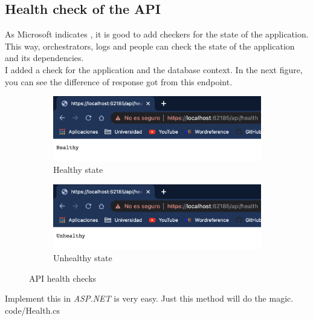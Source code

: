     \subsection{Health check of the API}
    As Microsoft indicates \cite{Health}, it is good to add checkers for the state of the application. This way, orchestrators, logs and people can check the state of the application and its dependencies. \\
    I added a check for the application and the database context. In the next figure, you can see the difference of response got from this endpoint. \\
    
    \begin{figure}[H]
        \centering
        \begin{subfigure}[T]{0.49\textwidth}
            \centering
            \includegraphics[width=\textwidth]{assets/healthy.png}
            \caption{Healthy state}
            \label{fig:impl_healthy}
        \end{subfigure}
        \hfill
        \begin{subfigure}[T]{0.49\textwidth}
            \centering
            \includegraphics[width=\textwidth]{assets/unhealthy.png}
            \caption{Unhealthy state}
            \label{fig:impl_unhealthy}
        \end{subfigure}
           \caption{API health checks}
           \label{fig:impl_health}
    \end{figure}

    Implement this in \textit{ASP.NET} is very easy. Just this method will do the magic. \\
    
    {code/Health.cs}

